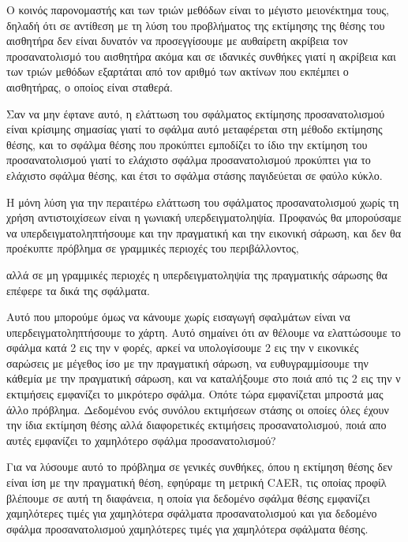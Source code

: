 \documentclass[a4paper,10pt]{article}
\begin{document}
Ο κοινός παρονομαστής και των τριών μεθόδων είναι το μέγιστο μειονέκτημα τους,
δηλαδή ότι σε αντίθεση με τη λύση του προβλήματος της εκτίμησης της θέσης του
αισθητήρα δεν είναι δυνατόν να προσεγγίσουμε με αυθαίρετη ακρίβεια τον
προσανατολισμό του αισθητήρα ακόμα και σε ιδανικές συνθήκες γιατί η ακρίβεια
και των τριών μεθόδων εξαρτάται από τον αριθμό των ακτίνων που εκπέμπει ο
αισθητήρας, ο οποίος είναι σταθερά.

Σαν να μην έφτανε αυτό, η ελάττωση του σφάλματος εκτίμησης προσανατολισμού
είναι κρίσιμης σημασίας γιατί το σφάλμα αυτό μεταφέρεται στη μέθοδο εκτίμησης
θέσης, και το σφάλμα θέσης που προκύπτει εμποδίζει το ίδιο την εκτίμηση του
προσανατολισμού γιατί το ελάχιστο σφάλμα προσανατολισμού προκύπτει για το
ελάχιστο σφάλμα θέσης, και έτσι το σφάλμα στάσης παγιδεύεται σε φαύλο κύκλο.

Η μόνη λύση για την περαιτέρω ελάττωση του σφάλματος προσανατολισμού χωρίς τη
χρήση αντιστοιχίσεων είναι η γωνιακή υπερδειγματοληψία. Προφανώς θα μπορούσαμε
να υπερδειγματοληπτήσουμε και την πραγματική και την εικονική σάρωση, και δεν
θα προέκυπτε πρόβλημα σε γραμμικές περιοχές του περιβάλλοντος,

αλλά σε μη γραμμικές περιοχές η υπερδειγματοληψία της πραγματικής σάρωσης θα
επέφερε τα δικά της σφάλματα.

Αυτό που μπορούμε όμως να κάνουμε χωρίς εισαγωγή σφαλμάτων είναι να
υπερδειγματοληπτήσουμε το χάρτη. Αυτό σημαίνει ότι αν θέλουμε να ελαττώσουμε το
σφάλμα κατά 2 εις την ν φορές, αρκεί να υπολογίσουμε 2 εις την ν εικονικές
σαρώσεις με μέγεθος ίσο με την πραγματική σάρωση, να ευθυγραμμίσουμε την
κάθεμία με την πραγματική σάρωση, και να καταλήξουμε στο ποιά από τις 2 εις την
ν εκτιμήσεις εμφανίζει το μικρότερο σφάλμα.  Οπότε τώρα εμφανίζεται μπροστά μας
άλλο πρόβλημα. Δεδομένου ενός συνόλου εκτιμήσεων στάσης οι οποίες όλες έχουν
την ίδια εκτίμηση θέσης αλλά διαφορετικές εκτιμήσεις προσανατολισμού, ποιά απο
αυτές εμφανίζει το χαμηλότερο σφάλμα προσανατολισμού?

Για να λύσουμε αυτό το πρόβλημα σε γενικές συνθήκες, όπου η εκτίμηση θέσης δεν
είναι ίση με την πραγματική θέση, εφηύραμε τη μετρική CAER, τις οποίας προφίλ
βλέπουμε σε αυτή τη διαφάνεια, η οποία για δεδομένο σφάλμα θέσης εμφανίζει
χαμηλότερες τιμές για χαμηλότερα σφάλματα προσανατολισμού και για δεδομένο
σφάλμα προσανατολισμού χαμηλότερες τιμές για χαμηλότερα σφάλματα θέσης.
\end{document}
